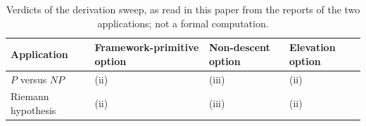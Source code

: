 \begin{table}[H]
  \centering
  \caption{Verdicts of the derivation sweep, as read in this paper from
  the reports of the two applications; not a formal computation.}
  \label{tab:verdict-signature}
  \small
  \begin{tabularx}{\textwidth}{@{}>{\raggedright\arraybackslash}p{}>{\centering\arraybackslash}X>{\centering\arraybackslash}X>{\centering\arraybackslash}X@{}}
    \toprule
    Application & Framework-primitive option & Non-descent option & Elevation option \\
    \midrule
    \(P\) versus \(NP\) & (ii) & (iii) & (ii) \\
    Riemann hypothesis & (ii) & (iii) & (ii) \\
    \bottomrule
  \end{tabularx}
\end{table}
